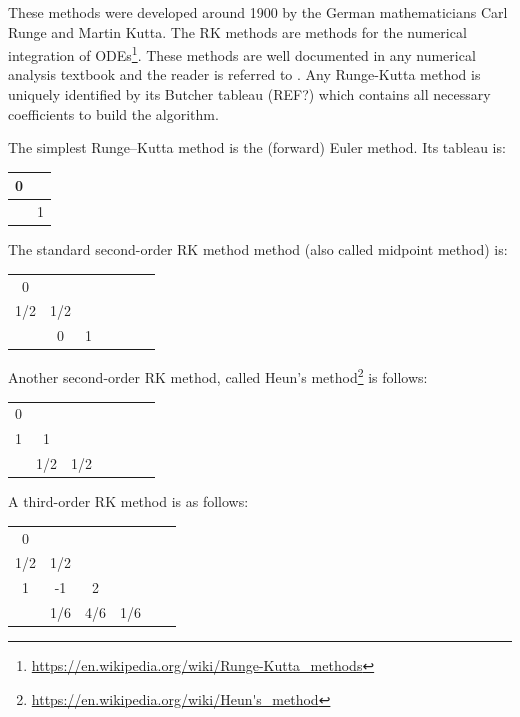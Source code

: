These methods were developed around 1900 by the German mathematicians Carl Runge and Martin Kutta.
The RK methods are methods for the numerical integration of 
ODEs\footnote{\url{https://en.wikipedia.org/wiki/Runge-Kutta_methods}}. These methods are well 
documented in any numerical analysis textbook and the reader is referred to \cite{gery10,tack10}.
Any Runge-Kutta method is uniquely identified by its Butcher tableau (REF?) which contains 
all necessary coefficients to build the algorithm.

The simplest Runge–Kutta method is the (forward) Euler method. Its tableau is:

\begin{mdframed}[backgroundcolor=blue!5]
\begin{tabular}{c|c}
0 & \\
\hline
 & 1
\end{tabular}
\end{mdframed}

 
The standard second-order RK method method (also called midpoint method) is:

\begin{mdframed}[backgroundcolor=blue!5]
\begin{tabular}{c|cccccc}
0 & \\
1/2 & 1/2 \\
\hline
 & 0 & 1 
\end{tabular}
\end{mdframed}

Another second-order RK method, called Heun's 
method\footnote{\url{https://en.wikipedia.org/wiki/Heun's_method}} is follows:

\begin{mdframed}[backgroundcolor=blue!5]
\begin{tabular}{c|cccccc}
0 & \\
1 & 1 \\
\hline
 & 1/2 & 1/2 
\end{tabular}
\end{mdframed}

A third-order RK method is as follows:

\begin{mdframed}[backgroundcolor=blue!5]
\begin{tabular}{c|ccccc}
0 & \\
1/2 & 1/2 \\
1 & -1 & 2 \\ 
\hline
 & 1/6 & 4/6  & 1/6
\end{tabular}
\end{mdframed}


